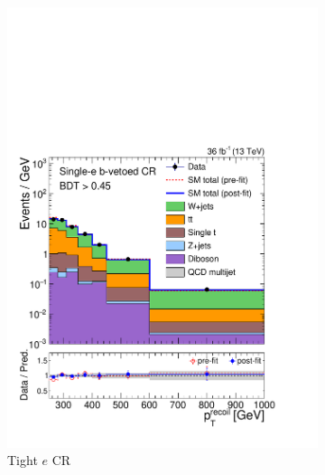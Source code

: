 \begin{figure}[]
\begin{center}
\begin{subfigure}[t]{0.24\textwidth}
            \includegraphics[width=\textwidth]{figures/monotop/postfit/stackedPostfit_singleelectronw_monotop.pdf}
            \caption{Tight $e$ CR}
        \end{subfigure}
        \begin{subfigure}[t]{0.24\textwidth}

\end{subfigure}
\end{center}
\end{figure}
